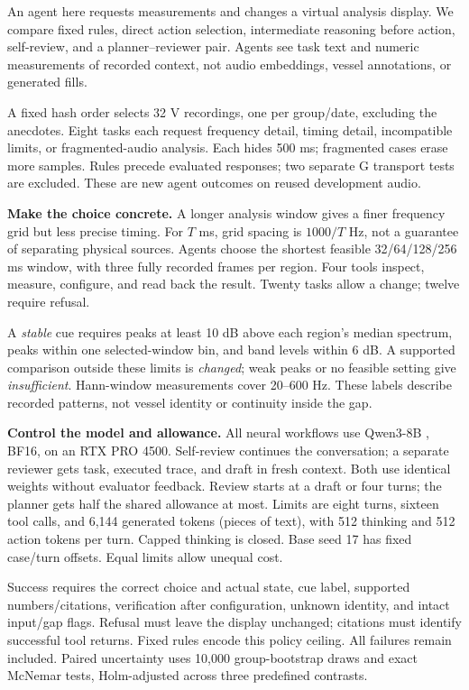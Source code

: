 \documentclass[runningheads,orivec]{llncs}
\begin{document}
An agent here requests measurements and changes a virtual analysis display. We compare fixed rules, direct action selection, intermediate reasoning before action, self-review, and a planner--reviewer pair. Agents see task text and numeric measurements of recorded context, not audio embeddings, vessel annotations, or generated fills.

A fixed hash order selects 32 V recordings, one per group/date, excluding the anecdotes. Eight tasks each request frequency detail, timing detail, incompatible limits, or fragmented-audio analysis. Each hides 500 ms; fragmented cases erase more samples. Rules precede evaluated responses; two separate G transport tests are excluded. These are new agent outcomes on reused development audio.

\textbf{Make the choice concrete.} A longer analysis window gives a finer frequency grid but less precise timing. For $T$ ms, grid spacing is $1000/T$ Hz, not a guarantee of separating physical sources. Agents choose the shortest feasible 32/64/128/256 ms window, with three fully recorded frames per region. Four tools inspect, measure, configure, and read back the result. Twenty tasks allow a change; twelve require refusal.

A \emph{stable} cue requires peaks at least 10 dB above each region's median spectrum, peaks within one selected-window bin, and band levels within 6 dB. A supported comparison outside these limits is \emph{changed}; weak peaks or no feasible setting give \emph{insufficient}. Hann-window measurements cover 20--600 Hz. These labels describe recorded patterns, not vessel identity or continuity inside the gap.

\textbf{Control the model and allowance.} All neural workflows use Qwen3-8B \cite{qwen3}, BF16, on an RTX PRO 4500. Self-review continues the conversation; a separate reviewer gets task, executed trace, and draft in fresh context. Both use identical weights without evaluator feedback. Review starts at a draft or four turns; the planner gets half the shared allowance at most. Limits are eight turns, sixteen tool calls, and 6,144 generated tokens (pieces of text), with 512 thinking and 512 action tokens per turn. Capped thinking is closed. Base seed 17 has fixed case/turn offsets. Equal limits allow unequal cost.

Success requires the correct choice and actual state, cue label, supported numbers/citations, verification after configuration, unknown identity, and intact input/gap flags. Refusal must leave the display unchanged; citations must identify successful tool returns. Fixed rules encode this policy ceiling. All failures remain included. Paired uncertainty uses 10,000 group-bootstrap draws and exact McNemar tests, Holm-adjusted across three predefined contrasts.
\end{document}
